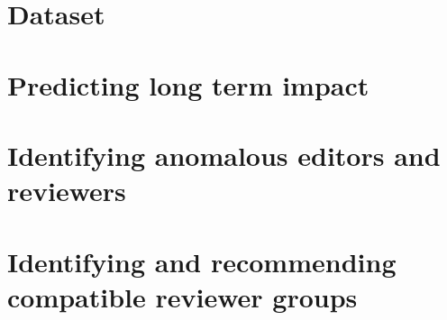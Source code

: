 \documentclass[twoside,phd]{iitkgp}
\begin{document}


%
%
%

%

\section{Dataset}



\section{Predicting long term impact}


\section{Identifying anomalous editors and reviewers}


\section{Identifying and recommending compatible reviewer groups}


%

%
%
\clearpage
\clearpage


\clearpage
\clearpage



\appendix

\clearemptydoublepage
\singlespace



\end{document}
